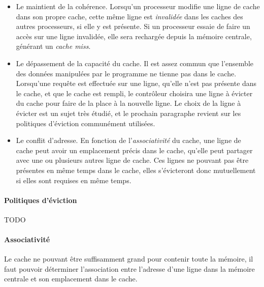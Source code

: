 \begin{itemize}
  \item Le maintient de la cohérence. Lorsqu'un processeur modifie une ligne de cache dans son propre cache, cette même ligne est \emph{invalidée} dans les caches des autres processeurs, si elle y est présente.
Si un processeur essaie de faire un accès sur une ligne invalidée, elle sera rechargée depuis la mémoire centrale, générant un \emph{cache miss}.
  \item Le dépassement de la capacité du cache. Il est assez commun que l'ensemble des données manipulées par le programme ne tienne pas dans le cache.
Lorsqu'une requête est effectuée sur une ligne, qu'elle n'est pas présente dans le cache, et que le cache est rempli, le contrôleur choisira une ligne à évicter du cache pour faire de la place à la nouvelle ligne.
Le choix de la ligne à évicter est un sujet très étudié, et le prochain paragraphe revient sur les politiques d'éviction communément utilisées.
  \item Le conflit d'adresse. En fonction de l'\emph{associativité} du cache, une ligne de cache peut avoir un emplacement précis dans le cache, qu'elle peut partager avec une ou plusieurs autres ligne de cache.
Ces lignes ne pouvant pas être présentes en même temps dans le cache, elles s'évicteront donc mutuellement si elles sont requises en même temps.
\end{itemize}



\paragraph{Politiques d'éviction}

TODO

\paragraph{Associativité}

Le cache ne pouvant être suffisamment grand pour contenir toute la mémoire, il faut pouvoir déterminer l'association entre l'adresse d'une ligne dans la mémoire centrale et son emplacement dans le cache.


